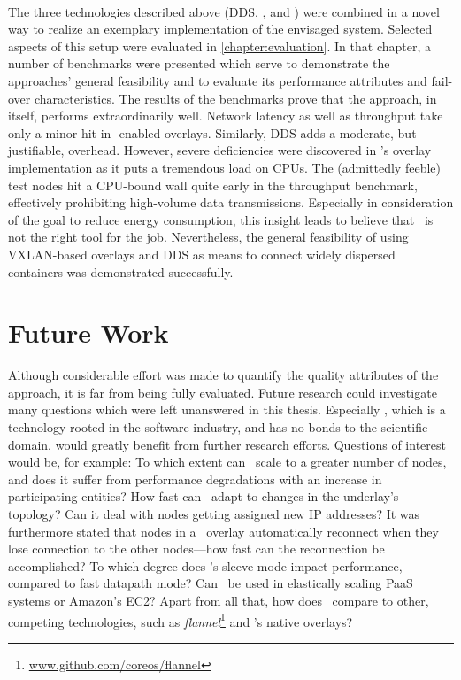 \paragraph{}
The three technologies described above (DDS, \docker , and \wnet ) were combined in a novel way to realize an exemplary implementation of the envisaged system. Selected aspects of this setup were evaluated in \autoref{chapter:evaluation}. In that chapter, a number of benchmarks were presented which serve to demonstrate the approaches' general feasibility and to evaluate its performance attributes and fail-over characteristics. The results of the benchmarks prove that the approach, in itself, performs extraordinarily well. Network latency as well as throughput take only a minor hit in \weave -enabled overlays. Similarly, DDS adds a moderate, but justifiable, overhead. However, severe deficiencies were discovered in \weave 's overlay implementation as it puts a tremendous load on CPUs. The (admittedly feeble) test nodes hit a CPU-bound wall quite early in the throughput benchmark, effectively prohibiting high-volume data transmissions. Especially in consideration of the goal to reduce energy consumption, this insight leads to believe that \wnet\ is not the right tool for the job. Nevertheless, the general feasibility of using VXLAN-based overlays and DDS as means to connect widely dispersed containers was demonstrated successfully.

\section{Future Work}
Although considerable effort was made to quantify the quality attributes of the approach, it is far from being fully evaluated. Future research could investigate many questions which were left unanswered in this thesis. Especially \wnet , which is a technology rooted in the software industry, and has no bonds to the scientific domain, would greatly benefit from further research efforts. Questions of interest would be, for example: To which extent can \wnet\ scale to a greater number of nodes, and does it suffer from performance degradations with an increase in participating entities? How fast can \wnet\ adapt to changes in the underlay's topology? Can it deal with nodes getting assigned new IP addresses? It was furthermore stated that nodes in a \wnet\ overlay automatically reconnect when they lose connection to the other nodes---how fast can the reconnection be accomplished? To which degree does \weave 's sleeve mode impact performance, compared to fast datapath mode? Can \weave\ be used in elastically scaling PaaS systems or Amazon's EC2? Apart from all that, how does \weave\ compare to other, competing technologies, such as \emph{flannel}\footnote{\url{www.github.com/coreos/flannel}} and \docker 's native overlays?

